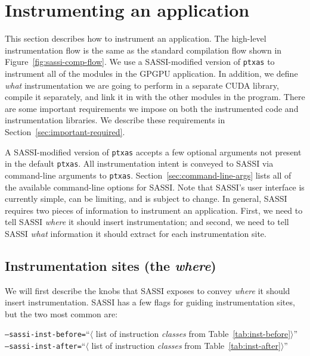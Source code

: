 \section{Instrumenting an application}

This section describes how to instrument an application.  The
high-level instrumentation flow is the same as the standard
compilation flow shown in Figure~\ref{fig:sassi-comp-flow}.  We use a
SASSI-modified version of \texttt{ptxas} to instrument all of the modules
in the GPGPU application.  In addition, we define \emph{what}
instrumentation we are going to perform in a separate CUDA library,
compile it separately, and link it in with the other modules in the
program.  There are some important requirements we impose on both the
instrumented code and instrumentation libraries.  We describe these
requirements in Section~\ref{sec:important-required}.

A SASSI-modified version of \texttt{ptxas} accepts a few optional
arguments not present in the default \texttt{ptxas}.  All
instrumentation intent is conveyed to SASSI via command-line arguments
to \texttt{ptxas}.  Section~\ref{sec:command-line-args} lists all of
the available command-line options for SASSI.  Note that SASSI's user
interface is currently simple, can be limiting, and is subject to
change. In general, SASSI requires two pieces of information to
instrument an application.  First, we need to tell SASSI \emph{where}
it should insert instrumentation; and second, we need to tell SASSI
\emph{what} information it should extract for each instrumentation
site.

\subsection{Instrumentation sites (the \emph{where})}

We will first describe the knobs that SASSI exposes to convey
\emph{where} it should insert instrumentation.  SASSI has a few flags
for guiding instrumentation sites, but the two most common are:\\
\begin{center}
\texttt{--sassi-inst-before=}``$\langle$ list of instruction
\emph{classes} from Table~\ref{tab:inst-before}$\rangle$'' \\

\texttt{--sassi-inst-after=}``$\langle$ list of instruction
\emph{classes} from Table~\ref{tab:inst-after}$\rangle$'' \\
\end{center}

